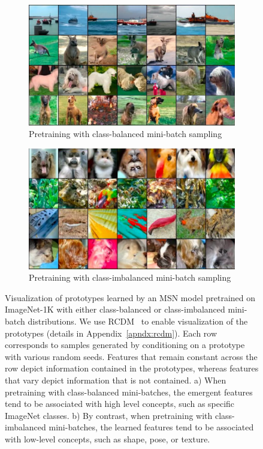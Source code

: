 \documentclass{article} %
\begin{document}
\begin{figure}[h]
    \centering
    \begin{subfigure}{0.49\textwidth}
        \centering
        \includegraphics[width=\linewidth]{assets/MSN_fig_balanced.pdf}
        \caption{Pretraining with class-balanced mini-batch sampling}
        \label{fig:visu_rcdm_balanced}
    \end{subfigure}\hfill
    \begin{subfigure}{0.49\textwidth}
        \centering
        \includegraphics[width=\linewidth]{assets/MSN_fig_unbalanced.pdf}
        \caption{Pretraining with class-imbalanced mini-batch sampling}
        \label{fig:visu_rcdm_unbalanced}
    \end{subfigure}
    \caption{
    Visualization of prototypes learned by an MSN model pretrained on ImageNet-1K with either class-balanced or class-imbalanced mini-batch distributions.
    We use RCDM~\citep{bordes2022high} to enable visualization of the prototypes (details in Appendix~\ref{apndx:rcdm}).
    Each row corresponds to samples generated by conditioning on a prototype with various random seeds.
    Features that remain constant across the row depict information contained in the prototypes, whereas features that vary depict information that is not contained.
    a) When pretraining with class-balanced mini-batches, the emergent features tend to be associated with high level concepts, such as specific ImageNet classes.
    b) By contrast, when pretraining with class-imbalanced mini-batches, the learned features tend to be associated with low-level concepts, such as shape, pose, or texture.}
    \label{fig:visu_rcdm_sampling}
\end{figure}
\end{document}
